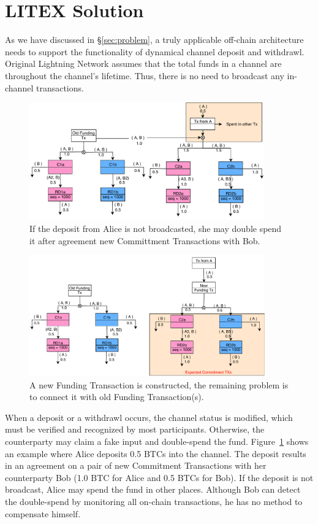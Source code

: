 \section{LITEX Solution}
\label{sec:solution}


As we have discussed in \S\ref{sec:problem}, a truly applicable off-chain
architecture needs to support the functionality of dynamical channel deposit and
withdrawl. Original Lightning Network assumes that the total funds in a channel
are throughout the channel's lifetime. Thus, there is no need to broadcast any
in-channel transactions.

\begin{figure}[H]
\centering
\includegraphics[width=4in]{figs/fake.pdf}
\vspace{-6pt}
\caption{If the deposit from Alice is not broadcasted, she may double spend it after agreement new Committment Transactions with Bob.}
\label{fig:fake}
\end{figure}

\begin{figure}[H]
\centering
\includegraphics[width=4in]{figs/fund.pdf}
\vspace{-6pt}
\caption{A new Funding Transaction is constructed, the remaining problem is to connect it with old Funding Transaction(s).}
\label{fig:fund}
\end{figure}


When a deposit or a withdrawl occurs, the channel status is modified, which must be verified and recognized by most participants. Otherwise, the counterparty may claim a fake input and double-spend the fund. Figure~\ref{fig:fake} shows an example where Alice deposits 0.5 BTCs into the channel. The deposit results in an agreement on a pair of new Commitment Transactions with her counterparty Bob (1.0 BTC for Alice and 0.5 BTCs for Bob). If the deposit is not broadcast, Alice may spend the fund in other places. Although Bob can detect the double-spend by monitoring all on-chain transactions, he has no method to compensate himself.


